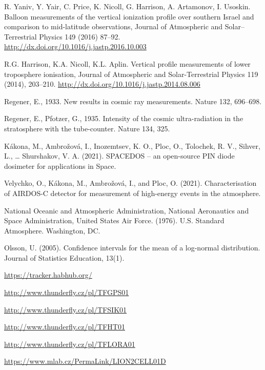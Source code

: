 \documentclass{Rpd}
\begin{document}
\begin{thebibliography}{99.}
 R. Yaniv, Y. Yair, C. Price, K. Nicoll, G. Harrison, A. Artamonov, I. Usoskin. Balloon measurements of the vertical ionization profile over southern Israel and comparison to mid-latitude observations, Journal of Atmospheric and Solar–Terrestrial Physics 149 (2016) 87–92. \url{http://dx.doi.org/10.1016/j.jastp.2016.10.003}

 R.G. Harrison, K.A. Nicoll, K.L. Aplin. Vertical profile measurements of lower troposphere ionisation, Journal of Atmospheric and Solar-Terrestrial Physics 119 (2014), 203–210. \url{http://dx.doi.org/10.1016/j.jastp.2014.08.006}

 Regener, E., 1933. New results in cosmic ray measurements. Nature 132, 696–698.

 Regener, E., Pfotzer, G., 1935. Intensity of the cosmic ultra-radiation in the stratosphere with the tube-counter. Nature 134, 325.

 Kákona, M., Ambrožová, I., Inozemtsev, K. O., Ploc, O., Tolochek, R. V., Sihver, L., … Shurshakov, V. A. (2021). SPACEDOS – an open-source PIN diode dosimeter for applications in Space.

 Velychko, O., Kákona, M., Ambrožová, I., and Ploc, O. (2021). Characterisation of AIRDOS-C detector for measurement of high-energy events in the atmosphere.

 National Oceanic and Atmospheric Administration, National Aeronautics and Space Administration, United States Air Force. (1976). U.S. Standard Atmosphere. Washington, DC.

 Olsson, U. (2005). Confidence intervals for the mean of a log-normal distribution. Journal of Statistics Education, 13(1).

 \url{https://tracker.habhub.org/}

 \url{http://www.thunderfly.cz/pl/TFGPS01}

 \url{http://www.thunderfly.cz/pl/TFSIK01}

 \url{http://www.thunderfly.cz/pl/TFHT01}

 \url{http://www.thunderfly.cz/pl/TFLORA01}

 \url{https://www.mlab.cz/PermaLink/LION2CELL01D}



\end{thebibliography}
\end{document}
